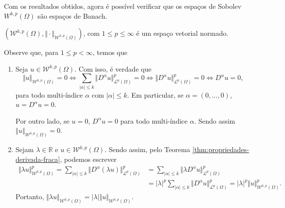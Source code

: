 \documentclass[a4paper, 11pt]{book}
\theoremstyle{definition}
\newcommand{\bR}{\mathbb{R}}
\newcommand{\cL}{\mathcal{L}}
\newcommand{\cW}{\mathcal{W}}
\begin{document}
Com os resultados obtidos, agora é possível verificar que os espaços de Sobolev $W^{k,p}(\Omega)$ são espaços de Banach.

\begin{tbox}
    $(\cW^{k,p}(\Omega), \Vert \cdot \Vert_{\cW^{k,p}(\Omega)})$, com $1 \leqslant p \leqslant \infty$ é um espaço vetorial normado.
\end{tbox}
\begin{prf}
    Observe que, para $1 \leqslant p < \infty$, temos que
    \begin{enumerate}[leftmargin=*]
        \item Seja $u \in \cW^{k,p}(\Omega)$. Com isso, é verdade que
        \[
            \Vert u \Vert_{\cW^{k,p}(\Omega)} = 0 \iff \sum_{|\alpha| \leqslant k} \Vert D^\alpha u \Vert_{\cL^p(\Omega)}^p = 0 \iff \Vert D^\alpha u \Vert_{\cL^p(\Omega)}^p = 0 \iff D^\alpha u = 0,
        \]
        para todo multi-índice $\alpha$ com $|\alpha| \leqslant k$.
        Em particular, se $\alpha = (0,\dots,0)$, $u = D^\alpha u = 0$.

        Por outro lado, se $u = 0$, $D^\alpha u = 0$ para todo multi-índice $\alpha$. Sendo assim $\Vert u \Vert_{\cW^{k,p}(\Omega)} = 0$.

        \item Sejam $\lambda \in \bR$ e $u \in \cW^{k,p}(\Omega)$. Sendo assim, pelo Teorema \ref{thm:propriedades-derivada-fraca}, podemos escrever
        \[
            \begin{aligned}
                \Vert \lambda u \Vert_{\cW^{k,p}(\Omega)}^p = \sum_{|\alpha| \leqslant k} \Vert D^\alpha (\lambda u) \Vert_{\cL^p(\Omega)}^p &= \sum_{|\alpha| \leqslant k} \Vert \lambda D^\alpha u \Vert_{\cL^p(\Omega)}^p\\ 
                &= |\lambda|^p\sum_{|\alpha| \leqslant k} \Vert D^\alpha u \Vert_{\cL^p(\Omega)}^p = |\lambda|^p\Vert u \Vert_{\cW^{k,p}(\Omega)}^p.
            \end{aligned}
        \]
        Portanto, $\Vert \lambda u \Vert_{\cW^{k,p}(\Omega)} = |\lambda|\Vert u \Vert_{\cW^{k,p}(\Omega)}$.


\end{enumerate}
\end{prf}
\end{document}
